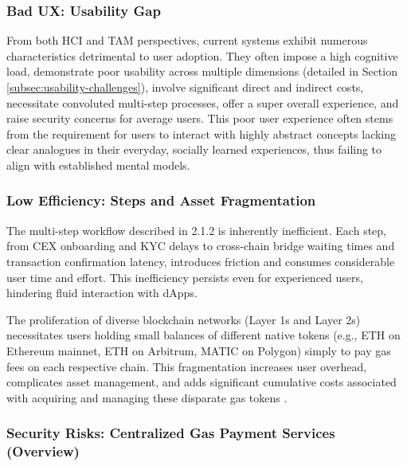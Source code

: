 \documentclass[preprint,12pt]{elsarticle}
\begin{document}
\subsubsection{Bad UX: Usability Gap}

From both HCI and TAM perspectives\cite{frohlich2022,shneiderman2010,norman2013,rogers2023,murray2023,preece1994,helander2014,davis1989,maranguni2015}, current systems exhibit numerous characteristics detrimental to user adoption. They often impose a high cognitive load, demonstrate poor usability across multiple dimensions (detailed in Section \ref{subsec:usability-challenges}), involve significant direct and indirect costs, necessitate convoluted multi-step processes, offer a super overall experience, and raise security concerns for average users\cite{frohlich2022}. This poor user experience often stems from the requirement for users to interact with highly abstract concepts lacking clear analogues in their everyday, socially learned experiences, thus failing to align with established mental models\cite{glomann2019}.

\subsubsection{Low Efficiency: Steps and Asset Fragmentation}

The multi-step workflow described in 2.1.2 is inherently inefficient. Each step, from CEX onboarding and KYC delays to cross-chain bridge waiting times and transaction confirmation latency, introduces friction and consumes considerable user time and effort. This inefficiency persists even for experienced users, hindering fluid interaction with dApps\cite{pacheco2023}.

The proliferation of diverse blockchain networks (Layer 1s and Layer 2s) necessitates users holding small balances of different native tokens (e.g., ETH on Ethereum mainnet, ETH on Arbitrum, MATIC on Polygon) simply to pay gas fees on each respective chain. This fragmentation increases user overhead, complicates asset management, and adds significant cumulative costs associated with acquiring and managing these disparate gas tokens \cite{l2fees2024, ultrasoundmoney}.

\subsubsection{Security Risks: Centralized Gas Payment Services (Overview)}
\end{document}
